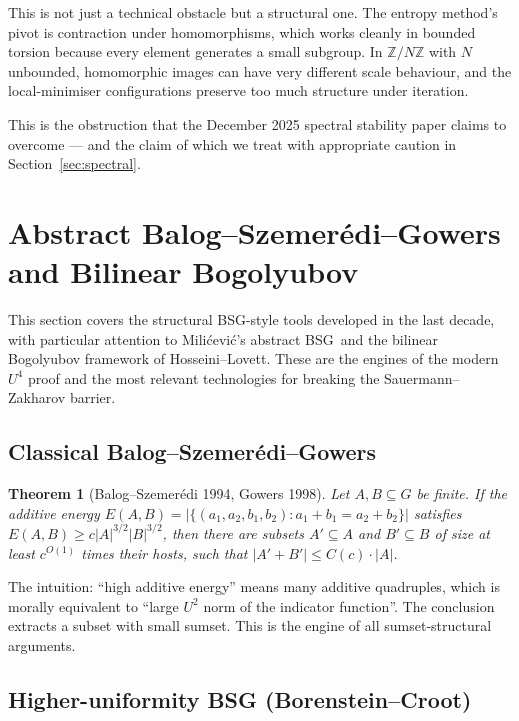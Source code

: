 \documentclass[11pt,a4paper]{article}
\theoremstyle{plain}
\newtheorem{theorem}{Theorem}[section]
\theoremstyle{definition}
\theoremstyle{remark}
\newcommand{\Z}{\mathbb{Z}}
\newcommand{\BSG}{\textsf{BSG}}
\begin{document}
This is not just a technical obstacle but a structural one. The entropy method's pivot is contraction under homomorphisms, which works cleanly in bounded torsion because every element generates a small subgroup. In $\Z/N\Z$ with $N$ unbounded, homomorphic images can have very different scale behaviour, and the local-minimiser configurations preserve too much structure under iteration.

This is the obstruction that the December 2025 spectral stability paper claims to overcome --- and the claim of which we treat with appropriate caution in Section~\ref{sec:spectral}.

\section{Abstract Balog--Szemer\'edi--Gowers and Bilinear Bogolyubov}\label{sec:abstract-bsg}

This section covers the structural \BSG-style tools developed in the last decade, with particular attention to Milićević's abstract \BSG\ and the bilinear Bogolyubov framework of Hosseini--Lovett. These are the engines of the modern $U^4$ proof and the most relevant technologies for breaking the Sauermann--Zakharov barrier.

\subsection{Classical Balog--Szemer\'edi--Gowers}

\begin{theorem}[Balog--Szemer\'edi 1994, Gowers 1998]
Let $A, B \subseteq G$ be finite. If the additive energy $E(A, B) = |\{(a_1, a_2, b_1, b_2) : a_1 + b_1 = a_2 + b_2\}|$ satisfies $E(A, B) \geq c |A|^{3/2} |B|^{3/2}$, then there are subsets $A' \subseteq A$ and $B' \subseteq B$ of size at least $c^{O(1)}$ times their hosts, such that $|A' + B'| \leq C(c) \cdot |A|$.
\end{theorem}

The intuition: ``high additive energy'' means many additive quadruples, which is morally equivalent to ``large $U^2$ norm of the indicator function''. The conclusion extracts a subset with small sumset. This is the engine of all sumset-structural arguments.

\subsection{Higher-uniformity BSG (Borenstein--Croot)}
\end{document}
